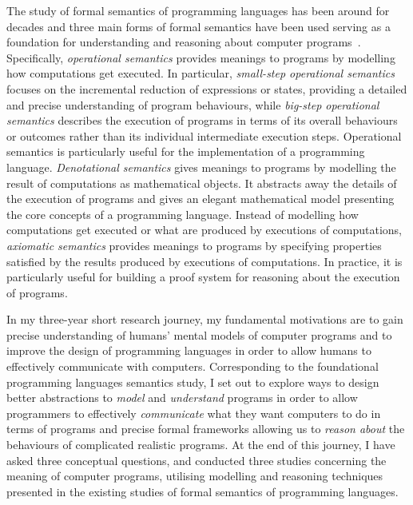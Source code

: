 The study of formal semantics of programming languages has been around for decades and three main forms of formal semantics have been used serving as a foundation for understanding and reasoning about computer programs~\citep{10.5555/151145, citeulike:105547}. Specifically, \emph{operational semantics} provides meanings to programs by modelling how computations get executed. In particular, \emph{small-step operational semantics} focuses on the incremental reduction of expressions or states, providing a detailed and precise understanding of program behaviours, while \emph{big-step operational semantics} describes the execution of programs in terms of its overall behaviours or outcomes rather than its individual intermediate execution steps. Operational semantics is particularly useful for the implementation of a programming language. \emph{Denotational semantics} gives meanings to programs by modelling the result of computations as mathematical objects. It abstracts away the details of the execution of programs and gives an elegant mathematical model presenting the core concepts of a programming language. Instead of modelling how computations get executed or what are produced by executions of computations, \emph{axiomatic semantics} provides meanings to programs by specifying properties satisfied by the results produced by executions of computations. In practice, it is particularly useful for building a proof system for reasoning about the execution of programs.

In my three-year short research journey, my fundamental motivations are to gain precise understanding of humans' mental models of computer programs and to improve the design of programming languages in order to allow humans to effectively communicate with computers. Corresponding to the foundational programming languages semantics study, I set out to explore ways to design better abstractions to \emph{model} and \emph{understand} programs in order to allow programmers to effectively \emph{communicate} what they want computers to do in terms of programs and precise formal frameworks allowing us to \emph{reason about} the behaviours of complicated realistic programs.
At the end of this journey, I have asked three conceptual questions, and conducted three studies concerning the meaning of computer programs, utilising modelling and reasoning techniques presented in the existing studies of formal semantics of programming languages.


